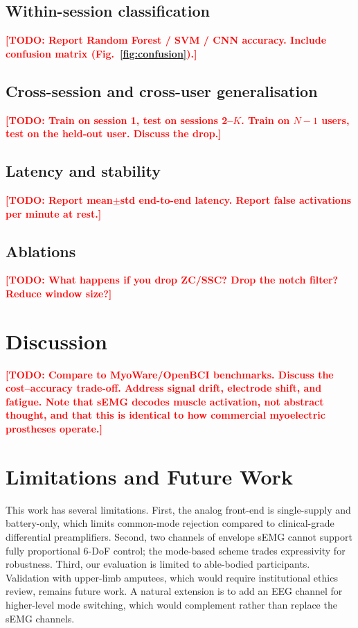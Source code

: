 \documentclass[conference]{IEEEtran}
\newcommand{\todo}[1]{\textcolor{red}{\textbf{[TODO: #1]}}}
\begin{document}
\subsection{Within-session classification}
\todo{Report Random Forest / SVM / CNN accuracy. Include confusion matrix (Fig.~\ref{fig:confusion}).}

\subsection{Cross-session and cross-user generalisation}
\todo{Train on session 1, test on sessions 2--$K$. Train on $N-1$ users, test on the held-out user. Discuss the drop.}

\subsection{Latency and stability}
\todo{Report mean$\pm$std end-to-end latency. Report false activations per minute at rest.}

\subsection{Ablations}
\todo{What happens if you drop ZC/SSC? Drop the notch filter? Reduce window size?}

\section{Discussion}
\label{sec:discussion}

\todo{Compare to MyoWare/OpenBCI benchmarks. Discuss the cost--accuracy
trade-off. Address signal drift, electrode shift, and fatigue. Note that
sEMG decodes muscle activation, not abstract thought, and that this is
identical to how commercial myoelectric prostheses operate.}

\section{Limitations and Future Work}
\label{sec:limitations}

This work has several limitations.
First, the analog front-end is single-supply and battery-only, which
limits common-mode rejection compared to clinical-grade differential
preamplifiers.
Second, two channels of envelope sEMG cannot support fully
proportional 6-DoF control; the mode-based scheme trades expressivity for
robustness.
Third, our evaluation is limited to able-bodied participants. Validation
with upper-limb amputees, which would require institutional ethics
review, remains future work.
A natural extension is to add an EEG channel for higher-level mode
switching, which would complement rather than replace the sEMG channels.
\end{document}
